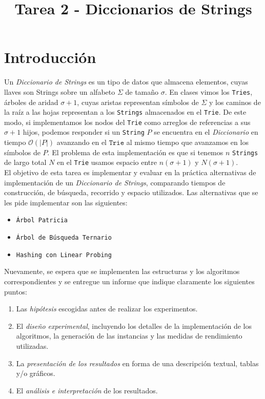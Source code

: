 \documentclass[dcc,uchile]{fcfmcourse}
\title{Tarea 2 - Diccionarios de Strings}
\begin{document}
\captionsetup[table]{name=Tabla}
\captionsetup[table]{name=Figura}

\maketitle
\vspace{-1ex}
\section{Introducción}
Un \textit{Diccionario de Strings} es un tipo de datos que almacena elementos, cuyas llaves son Strings sobre un alfabeto $\Sigma$ de tamaño $\sigma$. En clases vimos los \texttt{Tries}, árboles de aridad $\sigma+1$, cuyas aristas representan símbolos de $\Sigma$ y los caminos de la raíz a las hojas representan a los \texttt{Strings} almacenados en el \texttt{Trie}. De este modo, si implementamos los nodos del \texttt{Trie} como arreglos de referencias a sus $\sigma+1$ hijos, podemos responder si un \texttt{String} $P$ se encuentra en el \textit{Diccionario} en tiempo $\mathcal{O}(|P|)$ avanzando en el $\texttt{Trie}$ al mismo tiempo que avanzamos en los símbolos de $P$. El problema de esta implementación es que si tenemos $n$ \texttt{Strings} de largo total $N$ en el \texttt{Trie} usamos espacio entre $n(\sigma+1)$ y $N(\sigma+1)$.\\

El objetivo de esta tarea es implementar y evaluar en la práctica alternativas de implementación de un \textit{Diccionario de Strings}, comparando tiempos de construcción, de búsqueda, recorrido y espacio utilizados. Las alternativas que se les pide implementar son las siguientes:

\begin{itemize}
\item \texttt{Árbol Patricia}
\item \texttt{Árbol de Búsqueda Ternario}
\item \texttt{Hashing con Linear Probing}
\end{itemize}

Nuevamente, se espera que se implementen las estructuras y los algoritmos correspondientes y se entregue un informe que indique claramente los siguientes puntos:
\begin{enumerate}[1.]
    \item Las \textit{hipótesis} escogidas antes de realizar los experimentos.
    \item El \textit{diseño experimental}, incluyendo los detalles de la implementación de los algoritmos, la generación de las instancias y las medidas de rendimiento utilizadas.
    \item La \textit{presentación de los resultados} en forma de una descripción textual, tablas y/o gráficos.
    \item El \textit{análisis e interpretación} de los resultados.
\end{enumerate}
\newpage
\end{document}
